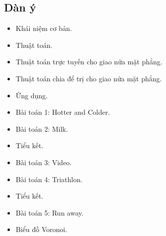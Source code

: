 \documentclass[11pt]{article}
\begin{document}
\subsection*{Dàn ý}

\begin{itemize}
  \item Khái niệm cơ bản.
  \item Thuật toán.
  \item Thuật toán trực tuyến cho giao nửa mặt phẳng.
  \item Thuật toán chia để trị cho giao nửa mặt phẳng.
  \item Ứng dụng.
  \item Bài toán 1: Hotter and Colder.
  \item Bài toán 2: Milk.
  \item Tiểu kết.
  \item Bài toán 3: Video.
  \item Bài toán 4: Triathlon.
  \item Tiểu kết.
  \item Bài toán 5: Run away.
  \item Biểu đồ Voronoi.
\end{itemize}
\end{document}
